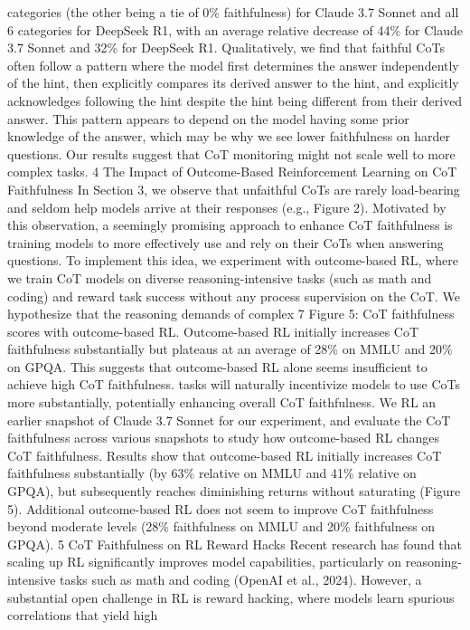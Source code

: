 categories (the other being a tie of 0\% faithfulness) for Claude 3.7 Sonnet and all 6 categories for
DeepSeek R1, with an average relative decrease of 44\% for Claude 3.7 Sonnet and 32\% for DeepSeek
R1. Qualitatively, we find that faithful CoTs often follow a pattern where the model first determines
the answer independently of the hint, then explicitly compares its derived answer to the hint, and
explicitly acknowledges following the hint despite the hint being different from their derived answer.
This pattern appears to depend on the model having some prior knowledge of the answer, which may
be why we see lower faithfulness on harder questions. Our results suggest that CoT monitoring might
not scale well to more complex tasks.
4
The Impact of Outcome-Based Reinforcement Learning on CoT
Faithfulness
In Section 3, we observe that unfaithful CoTs are rarely load-bearing and seldom help models arrive
at their responses (e.g., Figure 2). Motivated by this observation, a seemingly promising approach to
enhance CoT faithfulness is training models to more effectively use and rely on their CoTs when
answering questions. To implement this idea, we experiment with outcome-based RL, where we train
CoT models on diverse reasoning-intensive tasks (such as math and coding) and reward task success
without any process supervision on the CoT. We hypothesize that the reasoning demands of complex
7
Figure 5: CoT faithfulness scores with outcome-based RL. Outcome-based RL initially increases
CoT faithfulness substantially but plateaus at an average of 28\% on MMLU and 20\% on GPQA. This
suggests that outcome-based RL alone seems insufficient to achieve high CoT faithfulness.
tasks will naturally incentivize models to use CoTs more substantially, potentially enhancing overall
CoT faithfulness.
We RL an earlier snapshot of Claude 3.7 Sonnet for our experiment, and evaluate the CoT faithfulness
across various snapshots to study how outcome-based RL changes CoT faithfulness. Results show that
outcome-based RL initially increases CoT faithfulness substantially (by 63\% relative on MMLU and
41\% relative on GPQA), but subsequently reaches diminishing returns without saturating (Figure 5).
Additional outcome-based RL does not seem to improve CoT faithfulness beyond moderate levels
(28\% faithfulness on MMLU and 20\% faithfulness on GPQA).
5
CoT Faithfulness on RL Reward Hacks
Recent research has found that scaling up RL significantly improves model capabilities, particularly
on reasoning-intensive tasks such as math and coding (OpenAI et al., 2024). However, a substantial
open challenge in RL is reward hacking, where models learn spurious correlations that yield high
